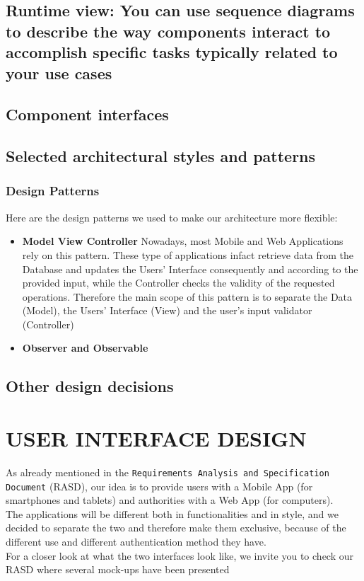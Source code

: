 \documentclass[12pt,a4paper]{article}
\begin{document}
\subsection{Runtime view: You can use sequence diagrams to describe the way components interact to accomplish specific tasks typically related to your use cases}
\subsection{Component interfaces}
\subsection{Selected architectural styles and patterns}
\subsubsection{Design Patterns}
Here are the design patterns we used to make our architecture more flexible:
\begin{itemize}
\item \textbf{Model View Controller}
Nowadays, most Mobile and Web Applications rely on this pattern. These type of applications infact retrieve data from the Database and updates the Users' Interface consequently and according to the provided input, while the Controller checks the validity of the requested operations. Therefore the main scope of this pattern is to separate the Data (Model), the Users' Interface (View) and the user's input validator (Controller)
\item  \textbf{Observer and Observable}
\end{itemize}
\subsection{Other design decisions}
\section{USER INTERFACE DESIGN}
As already mentioned in the \texttt{Requirements Analysis and Specification Document} (RASD), our idea is to provide users with a Mobile App (for smartphones and tablets) and authorities with a Web App (for computers).\\ The applications will be different both in functionalities and in style, and we decided to separate the two and therefore make them exclusive, because of the different use and different authentication method they have.\\ For a closer look at what the two interfaces look like, we invite you to check our RASD where several mock-ups have been presented
\end{document}
